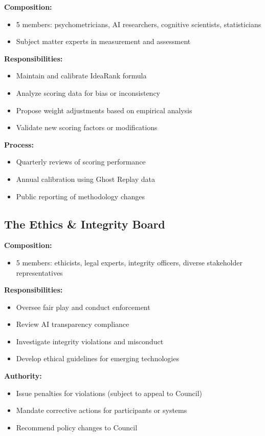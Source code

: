 \textbf{Composition:}
\begin{itemize}[leftmargin=*]
  \item 5 members: psychometricians, AI researchers, cognitive scientists, statisticians
  \item Subject matter experts in measurement and assessment
\end{itemize}

\textbf{Responsibilities:}
\begin{itemize}[leftmargin=*]
  \item Maintain and calibrate IdeaRank formula
  \item Analyze scoring data for bias or inconsistency
  \item Propose weight adjustments based on empirical analysis
  \item Validate new scoring factors or modifications
\end{itemize}

\textbf{Process:}
\begin{itemize}[leftmargin=*]
  \item Quarterly reviews of scoring performance
  \item Annual calibration using Ghost Replay data
  \item Public reporting of methodology changes
\end{itemize}

\subsection{The Ethics \& Integrity Board}

\textbf{Composition:}
\begin{itemize}[leftmargin=*]
  \item 5 members: ethicists, legal experts, integrity officers, diverse stakeholder representatives
\end{itemize}

\textbf{Responsibilities:}
\begin{itemize}[leftmargin=*]
  \item Oversee fair play and conduct enforcement
  \item Review AI transparency compliance
  \item Investigate integrity violations and misconduct
  \item Develop ethical guidelines for emerging technologies
\end{itemize}

\textbf{Authority:}
\begin{itemize}[leftmargin=*]
  \item Issue penalties for violations (subject to appeal to Council)
  \item Mandate corrective actions for participants or systems
  \item Recommend policy changes to Council
\end{itemize}

